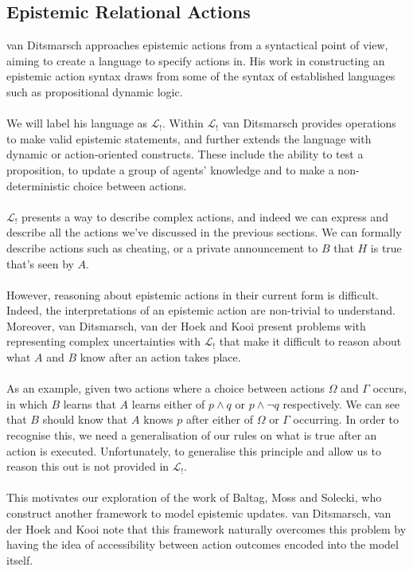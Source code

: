 \documentclass[12pt, a4paper, titlepage]{scrartcl}
\begin{document}
\subsection{Epistemic Relational Actions} \label{epi_acts}
van Ditsmarsch approaches epistemic actions from a syntactical point of view,
aiming to create a language to specify actions in.
His work in constructing an epistemic action syntax draws from some of the
syntax of established languages such as propositional dynamic
logic.\citep{ditmarsch99knowledge,ditmarsch2002dga}\\
\\
We will label his language as $\mathcal{L}_{!}$.
Within $\mathcal{L}_{!}$ van Ditsmarsch provides operations to make valid
epistemic statements, and further extends the language with dynamic or
action-oriented constructs.
These include the ability to test a proposition, to update a group of agents'
knowledge and to make a non-deterministic choice between actions.\\
\\
$\mathcal{L}_{!}$ presents a way to describe complex actions, and indeed we can
express and describe all the actions we've discussed in the previous sections.
We can formally describe actions such as cheating, or a private
announcement to $B$ that $H$ is true that's seen by $A$.\\
\\
However, reasoning about epistemic actions in their current form is difficult.
Indeed, the interpretations of an epistemic action are non-trivial to
understand.
Moreover, van Ditsmarsch, van der Hoek and Kooi present problems with
representing complex uncertainties with $\mathcal{L}_{!}$ that make it difficult
to reason about what $A$ and $B$ know after an action takes place.\\
\\
As an example, given two actions where a choice between actions $\Omega$ and
$\Gamma$ occurs, in which $B$ learns that $A$ learns either of $p \land q$ or
$p \land \neg q$ respectively.
We can see that $B$ should know that $A$ knows $p$ after either of $\Omega$ or
$\Gamma$ occurring.
In order to recognise this, we need a generalisation of our rules on what is
true after an action is executed.
Unfortunately, to generalise this principle and allow us to reason this out is
not provided in $\mathcal{L}_{!}$.\citep{hoek2008dynamic}\\
\\
This motivates our exploration of the work of Baltag, Moss and Solecki, who construct
another framework to model epistemic updates.
van Ditsmarsch, van der Hoek and Kooi note that this framework naturally
overcomes this problem by having the idea of accessibility between action
outcomes encoded into the model itself.
\end{document}
